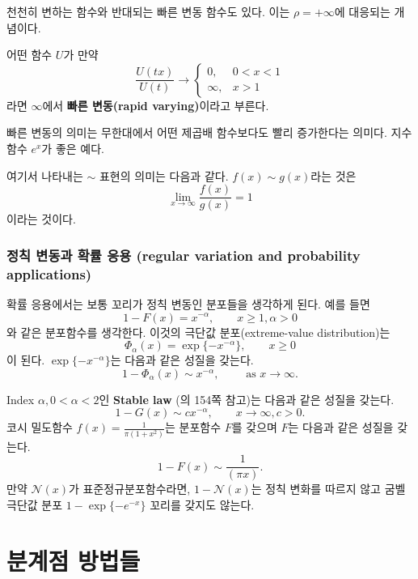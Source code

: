 \documentclass[b5paper,]{scrbook}
\theoremstyle{plain}
\theoremstyle{definition}
\numberwithin{equation}{section}
\let\BeginKnitrBlock\begin \let\EndKnitrBlock\end
\begin{document}
천천히 변하는 함수와 반대되는 빠른 변동 함수도 있다. 이는 \(\rho=+\infty\)에 대응되는 개념이다.

\BeginKnitrBlock{definition}[빠른 변동 함수]
\protect\hypertarget{def:unnamed-chunk-451}{}{\label{def:unnamed-chunk-451} {} }어떤 함수 \(U\)가 만약
\[
\frac{U(tx)}{U(t)}\rightarrow
\begin{cases}
0, & 0<x<1\\
\infty, & x>1
\end{cases}
\]
라면 \(\infty\)에서 \textbf{빠른 변동(rapid varying)}이라고 부른다.
\EndKnitrBlock{definition}

빠른 변동의 의미는 무한대에서 어떤 제곱배 함수보다도 빨리 증가한다는 의미다. 지수함수 \(e^{x}\)가 좋은 예다.

여기서 나타내는 \(\sim\) 표현의 의미는 다음과 같다. \(f(x)\sim g(x)\)라는 것은
\[\lim_{x\rightarrow\infty}\frac{f(x)}{g(x)}=1\]
이라는 것이다.

\hypertarget{----regular-variation-and-probability-applications}{%
\subsection{정칙 변동과 확률 응용 (regular variation and probability applications)}\label{----regular-variation-and-probability-applications}}

확률 응용에서는 보통 꼬리가 정칙 변동인 분포들을 생각하게 된다. 예를 들면
\[1-F(x)=x^{-\alpha}, \qquad{x\geq 1, \alpha >0}\]
와 같은 분포함수를 생각한다. 이것의 극단값 분포(extreme-value distribution)는
\[\Phi_{\alpha}(x) = \exp\{-x^{-\alpha}\}, \qquad{x\geq 0}\]
이 된다. \(\exp\{-x^{-\alpha}\}\)는 다음과 같은 성질을 갖는다.
\[1-\Phi_{\alpha}(x)\sim x^{-\alpha}, \qquad{\text{ as }x \rightarrow\infty.}\]

Index \(\alpha, 0<\alpha <2\)인 \textbf{Stable law} (\citep{Resnick2007}의 154쪽 참고)는 다음과 같은 성질을 갖는다.
\[1-G(x) \sim cx^{-\alpha}, \qquad{x\rightarrow\infty, c>0.}\]
코시 밀도함수 \(f(x)=\frac{1}{\pi (1+x^2)}\)는 분포함수 \(F\)를 갖으며 \(F\)는 다음과 같은 성질을 갖는다.
\[1-F(x) \sim \frac{1}{(\pi x)}.\]
만약 \(\mathcal{N}(x)\)가 표준정규분포함수라면, \(1-\mathcal{N}(x)\)는 정칙 변화를 따르지 않고 굼벨 극단값 분포 \(1-\exp\{-e^{-x}\}\) 꼬리를 갖지도 않는다. \citep{Resnick2007}

\hypertarget{pot}{%
\chapter{분계점 방법들}\label{pot}}
\end{document}
